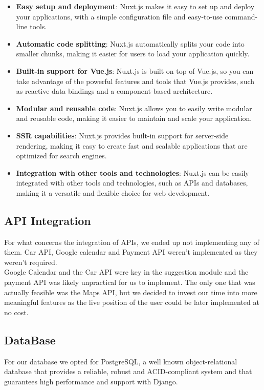 \documentclass[table, 12pt]{article}
\begin{document}
\begin{itemize}
\item \textbf{Easy setup and deployment}: Nuxt.js makes it easy to set up and deploy your applications, with a simple configuration file and easy-to-use command-line tools.

\item \textbf{Automatic code splitting}: Nuxt.js automatically splits your code into smaller chunks, making it easier for users to load your application quickly.

\item \textbf{Built-in support for Vue.js}: Nuxt.js is built on top of Vue.js, so you can take advantage of the powerful features and tools that Vue.js provides, such as reactive data bindings and a component-based architecture.

\item \textbf{Modular and reusable code}: Nuxt.js allows you to easily write modular and reusable code, making it easier to maintain and scale your application.

\item \textbf{SSR capabilities}: Nuxt.js provides built-in support for server-side rendering, making it easy to create fast and scalable applications that are optimized for search engines.

\item \textbf{Integration with other tools and technologies}: Nuxt.js can be easily integrated with other tools and technologies, such as APIs and databases, making it a versatile and flexible choice for web development.
\end{itemize} 

\subsection{API Integration}
For what concerns the integration of APIs, we ended up not implementing any of them. Car API, Google calendar and Payment API weren't implemented as they weren't required.\\
Google Calendar and the Car API were key in the suggestion module and the payment API was likely unpractical for us to implement. The only one that was actually feasible was 
the Maps API, but we decided to invest our time into more meaningful features as the live position of the user could be later implemented at no cost.


\subsection{DataBase}
For our database we opted for PostgreSQL, a well known object-relational
database that provides a reliable, robust and ACID-compliant system and that guarantees high performance and support with Django.
\end{document}
